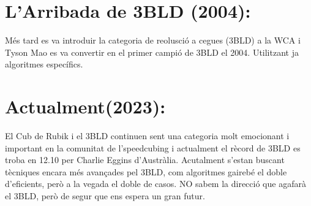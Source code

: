 \section{L'Arribada de 3BLD (2004):}

Més tard es va introduir la categoria de reolusció a cegues (3BLD) a la WCA i Tyson Mao es va convertir en el primer campió de 3BLD el 2004. Utilitzant ja algoritmes específics.

\section{Actualment(2023):}

El Cub de Rubik i el 3BLD continuen sent una categoria molt emocionant i important en la comunitat de l'speedcubing i actualment el rècord de 3BLD es troba en 12.10 per Charlie Eggins d'Austràlia. Acutalment s'estan buscant tècniques encara més avançades pel 3BLD, com algoritmes gairebé el doble d'eficients, però a la vegada el doble de casos. NO sabem la direcció que agafarà el 3BLD, però de segur que ens espera un gran futur.




